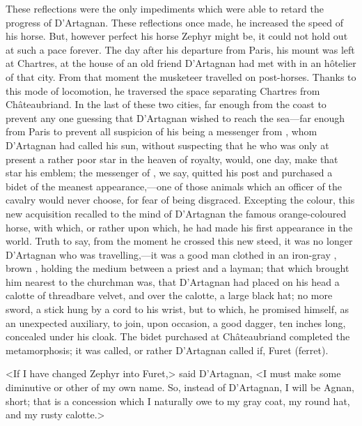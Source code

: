 These reflections were the only impediments which were able to retard the progress of D'Artagnan. These reflections once made, he increased the speed of his horse. But, however perfect his horse Zephyr might be, it could not hold out at such a pace forever. The day after his departure from Paris, his mount was left at Chartres, at the house of an old friend D'Artagnan had met with in an hôtelier of that city. From that moment the musketeer travelled on post-horses. Thanks to this mode of locomotion, he traversed the space separating Chartres from Châteaubriand. In the last of these two cities, far enough from the coast to prevent any one guessing that D'Artagnan wished to reach the sea—far enough from Paris to prevent all suspicion of his being a messenger from , whom D'Artagnan had called his sun, without suspecting that he who was only at present a rather poor star in the heaven of royalty, would, one day, make that star his emblem; the messenger of , we say, quitted his post and purchased a bidet of the meanest appearance,—one of those animals which an officer of the cavalry would never choose, for fear of being disgraced. Excepting the colour, this new acquisition recalled to the mind of D'Artagnan the famous orange-coloured horse, with which, or rather upon which, he had made his first appearance in the world. Truth to say, from the moment he crossed this new steed, it was no longer D'Artagnan who was travelling,—it was a good man clothed in an iron-gray , brown , holding the medium between a priest and a layman; that which brought him nearest to the churchman was, that D'Artagnan had placed on his head a calotte of threadbare velvet, and over the calotte, a large black hat; no more sword, a stick hung by a cord to his wrist, but to which, he promised himself, as an unexpected auxiliary, to join, upon occasion, a good dagger, ten inches long, concealed under his cloak. The bidet purchased at Châteaubriand completed the metamorphosis; it was called, or rather D'Artagnan called if, Furet (ferret).

<If I have changed Zephyr into Furet,> said D'Artagnan, <I must make some diminutive or other of my own name. So, instead of D'Artagnan, I will be Agnan, short; that is a concession which I naturally owe to my gray coat, my round hat, and my rusty calotte.>

